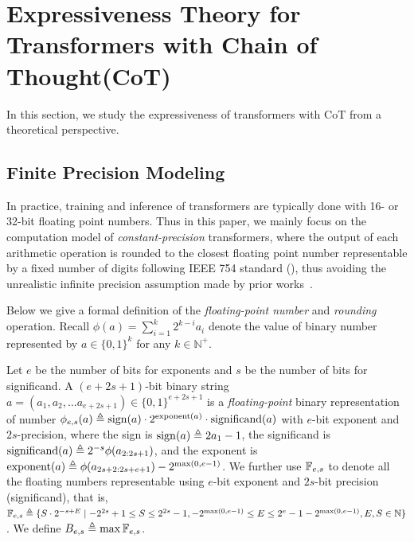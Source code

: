 
 
\section{Expressiveness Theory for Transformers with Chain of Thought(CoT)}\label{sec:main_result}

In this section, we study the expressiveness of transformers with CoT from a theoretical perspective. 

\subsection{Finite Precision Modeling}\label{subsec:finite_precision}

In practice, training and inference of transformers are typically done with 16- or 32-bit floating point numbers. Thus in this paper, we mainly focus on the computation model of \emph{constant-precision} transformers, where the output of each arithmetic operation is rounded to the closest  floating point number representable by a fixed number of digits following IEEE 754 standard (), thus avoiding the unrealistic infinite precision assumption made by prior works~\citep{perez2019turing, dehghani2018universal}.


Below we give a formal definition of the \emph{floating-point number} and \emph{rounding} operation. Recall  $\phi(a) = \sum_{i=1}^k 2^{k-i}a_i$ denote the value of binary number represented by $a\in \{0,1\}^k$ for any $k\in\mathbb{N}^+$. 



\begin{definition}
Let $e$ be the number of bits for exponents and $s$ be the number of bits for significand.  A $(e+2s+1)$-bit binary string $a = (a_1, a_2, \ldots a_{e+2s+1})\in \{0,1\}^{e+2s+1}$ is a \emph{floating-point} binary representation of number $\phi_{e,s}(a)\triangleq \operatorname*{sign}(a)\cdot 2^{\mathrm{exponent}(a)} \cdot \mathrm{significand}(a)$ with $e$-bit exponent and $2s$-precision, where the sign is $\operatorname*{sign}(a)\triangleq 2a_1-1$, the significand is $\mathrm{significand}(a)\triangleq 2^{-s}\phi(a_{2:2s+1})$, and the exponent is $\mathrm{exponent}(a)\triangleq \phi(a_{2s+2:2s+e+1})-2^{\max(0,e-1)}$. We further use $\mathbb{F}_{e,s}$ to denote all the floating numbers representable using $e$-bit exponent and $2s$-bit precision (significand), that is, $\mathbb{F}_{e,s}\triangleq \{ S\cdot 2^{-s +E} \mid -2^{2s}+1\le S\le 2^{2s}-1, -2^{\max(0,e-1)}\le E\le 2^e -1 -2^{\max(0,e-1)}, E,S\in\mathbb{N} \}$. We define $B_{e,s}\triangleq \max \mathbb{F}_{e,s}$.
\end{definition}

